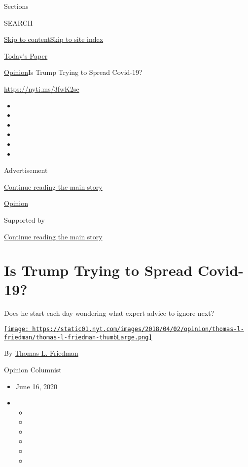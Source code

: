 Sections

SEARCH

\protect\hyperlink{site-content}{Skip to
content}\protect\hyperlink{site-index}{Skip to site index}

\href{https://myaccount.nytimes.com/auth/login?response_type=cookie\&client_id=vi}{}

\href{https://www.nytimes.com/section/todayspaper}{Today's Paper}

\href{/section/opinion}{Opinion}\textbar{}Is Trump Trying to Spread
Covid-19?

\href{https://nyti.ms/3fwK2se}{https://nyti.ms/3fwK2se}

\begin{itemize}
\item
\item
\item
\item
\item
\item
\end{itemize}

Advertisement

\protect\hyperlink{after-top}{Continue reading the main story}

\href{/section/opinion}{Opinion}

Supported by

\protect\hyperlink{after-sponsor}{Continue reading the main story}

\hypertarget{is-trump-trying-to-spread-covid-19}{%
\section{Is Trump Trying to Spread
Covid-19?}\label{is-trump-trying-to-spread-covid-19}}

Does he start each day wondering what expert advice to ignore next?

\href{https://www.nytimes.com/by/thomas-l-friedman}{\texttt{[image: https://static01.nyt.com/images/2018/04/02/opinion/thomas-l-friedman/thomas-l-friedman-thumbLarge.png]}}

By \href{https://www.nytimes.com/by/thomas-l-friedman}{Thomas L.
Friedman}

Opinion Columnist

\begin{itemize}
\item
  June 16, 2020
\item
  \begin{itemize}
  \item
  \item
  \item
  \item
  \item
  \item
  \end{itemize}
\end{itemize}

